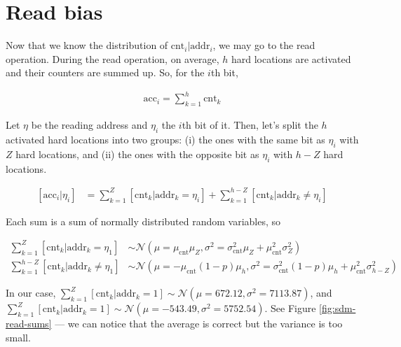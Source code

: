 \section{Read bias}

Now that we know the distribution of $\text{cnt}_i | \text{addr}_i$, we may go to the read operation. During the read operation, on average, $h$ hard locations are activated and their counters are summed up. So, for the $i$th bit,

\begin{align}
\text{acc}_i = \sum_{k=1}^{h} \text{cnt}_k
\end{align}

Let $\eta$ be the reading address and $\eta_i$ the $i$th bit of it. Then, let's split the $h$ activated hard locations into two groups: (i) the ones with the same bit as $\eta_i$ with $Z$ hard locations, and (ii) the ones with the opposite bit as $\eta_i$ with $h-Z$ hard locations.

\begin{align}
\left[ \text{acc}_i|\eta_i \right] &= \sum_{k=1}^{Z} \left[ \text{cnt}_k | \text{addr}_k=\eta_i \right] + \sum_{k=1}^{h-Z} \left[ \text{cnt}_k | \text{addr}_k \ne \eta_i \right]
\end{align}

Each sum is a sum of normally distributed random variables, so

\begin{align}
\sum_{k=1}^{Z} \left[ \text{cnt}_k | \text{addr}_k=\eta_1 \right] &\sim \mathcal{N}(\mu = \mu_\text{cnt} \mu_Z, \sigma^2 = \sigma_\text{cnt}^2 \mu_Z + \mu_\text{cnt}^2 \sigma^2_Z) \label{eqn:sdm-eta1-addr1} \\
\sum_{k=1}^{h-Z} \left[ \text{cnt}_k | \text{addr}_k \ne \eta_1 \right] &\sim \mathcal{N}(\mu = -\mu_\text{cnt} (1-p) \mu_h, \sigma^2 = \sigma^2_\text{cnt} (1-p) \mu_h + \mu_\text{cnt}^2 \sigma^2_{h-Z}) \label{eqn:sdm-eta1-addr0}
\end{align}

In our case, $\sum_{k=1}^{Z} \left[ \text{cnt}_k | \text{addr}_k=1 \right] \sim \mathcal{N}(\mu=672.12, \sigma^2=7113.87)$, and $\sum_{k=1}^{Z} \left[ \text{cnt}_k | \text{addr}_k=1 \right] \sim \mathcal{N}(\mu=-543.49, \sigma^2=5752.54)$. See Figure \ref{fig:sdm-read-sums} --- we can notice that the average is correct but the variance is too small.


